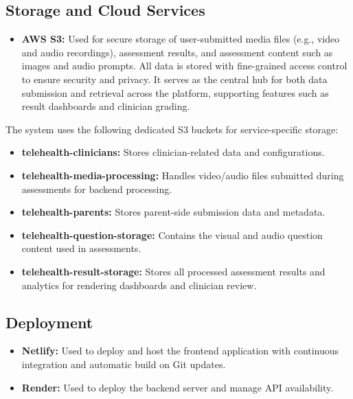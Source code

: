 \documentclass{article}
\begin{document}
\subsection{Storage and Cloud Services}

\begin{itemize}
    \item \textbf{AWS S3:} Used for secure storage of user-submitted media files (e.g., video and audio recordings), assessment results, and assessment content such as images and audio prompts. All data is stored with fine-grained access control to ensure security and privacy. It serves as the central hub for both data submission and retrieval across the platform, supporting features such as result dashboards and clinician grading.
\end{itemize}

\noindent The system uses the following dedicated S3 buckets for service-specific storage:

\begin{itemize}
    \item \textbf{telehealth-clinicians:} Stores clinician-related data and configurations.
    \item \textbf{telehealth-media-processing:} Handles video/audio files submitted during assessments for 
    backend processing.
    \item \textbf{telehealth-parents:} Stores parent-side submission data and metadata.
    \item \textbf{telehealth-question-storage:} Contains the visual and audio question content used in assessments.
    \item \textbf{telehealth-result-storage:} Stores all processed assessment results and analytics for rendering dashboards and clinician review.
\end{itemize}

\subsection{Deployment}
\begin{itemize}
    \item \textbf{Netlify:} Used to deploy and host the frontend application with continuous integration and automatic build on Git updates.
    \item \textbf{Render:} Used to deploy the backend server and manage API availability.
\end{itemize}
\end{document}
